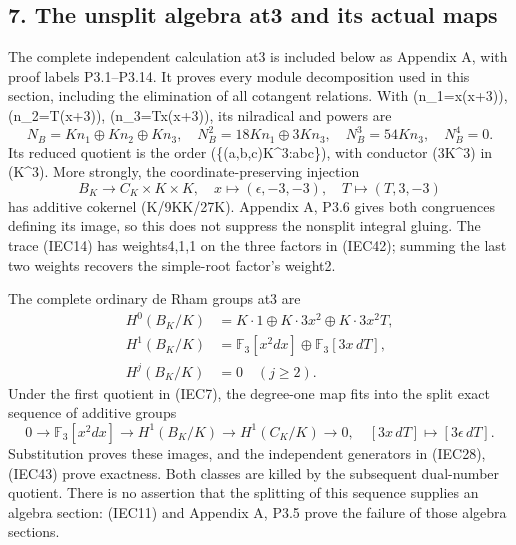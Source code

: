 \documentclass[
  10pt,
]{article}
\begin{document}
\subsection{7. The unsplit algebra at3 and its actual
maps}\label{the-unsplit-algebra-at3-and-its-actual-maps}

The complete independent calculation at3 is included below as Appendix
A, with proof labels P3.1--P3.14. It proves every module decomposition
used in this section, including the elimination of all cotangent
relations. With (n\_1=x(x+3)), (n\_2=T(x+3)), (n\_3=Tx(x+3)), its
nilradical and powers are \[
N_B=Kn_1\oplus Kn_2\oplus Kn_3,\quad
N_B^2=18Kn_1\oplus3Kn_3,\quad
N_B^3=54Kn_3,\quad N_B^4=0.
\tag{IEC41}
\] Its reduced quotient is the order
(\{(a,b,c)\in K\^{}3:a\equiv b\equiv c\}), with conductor
(3K\^{}3) in (K\^{}3). More strongly, the coordinate-preserving
injection \[
B_K\longrightarrow C_K\times K\times K,
\quad x\mapsto(\epsilon,-3,-3),\quad T\mapsto(T,3,-3)
\tag{IEC42}
\] has additive cokernel (K/9K\oplus K/27K). Appendix A, P3.6 gives both
congruences defining its image, so this does not suppress the nonsplit
integral gluing. The trace (IEC14) has weights4,1,1 on the three factors
in (IEC42); summing the last two weights recovers the simple-root
factor's weight2.

The complete ordinary de Rham groups at3 are \[
\begin{aligned}
H^0(B_K/K)&=K\cdot1\oplus K\cdot3x^2\oplus K\cdot3x^2T,\\
H^1(B_K/K)&=\mathbb F_3[x^2dx]\oplus\mathbb F_3[3x\,dT],\\
H^j(B_K/K)&=0\quad(j\ge2).
\end{aligned}
\tag{IEC43}
\] Under the first quotient in (IEC7), the degree-one map fits into the
split exact sequence of additive groups \[
0\longrightarrow\mathbb F_3[x^2dx]
\longrightarrow H^1(B_K/K)
\longrightarrow H^1(C_K/K)\longrightarrow0,
\quad[3x\,dT]\longmapsto[3\epsilon\,dT].
\tag{IEC44}
\] Substitution proves these images, and the independent generators in
(IEC28), (IEC43) prove exactness. Both classes are killed by the
subsequent dual-number quotient. There is no assertion that the
splitting of this sequence supplies an algebra section: (IEC11) and
Appendix A, P3.5 prove the failure of those algebra sections.
\end{document}
